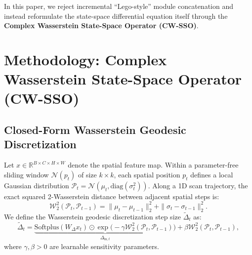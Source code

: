 \documentclass[10pt,journal,compsoc]{IEEEtran}
\begin{document}
In this paper, we reject incremental ``Lego-style'' module concatenation and instead reformulate the state-space differential equation itself through the \textbf{Complex Wasserstein State-Space Operator (CW-SSO)}.

\section{Methodology: Complex Wasserstein State-Space Operator (CW-SSO)}

\subsection{Closed-Form Wasserstein Geodesic Discretization}
Let $x \in \mathbb{R}^{B \times C \times H \times W}$ denote the spatial feature map. Within a parameter-free sliding window $\mathcal{N}(p_t)$ of size $k \times k$, each spatial position $p_t$ defines a local Gaussian distribution $\mathcal{P}_t = \mathcal{N}(\mu_t, \mathrm{diag}(\sigma_t^2))$. Along a 1D scan trajectory, the exact squared 2-Wasserstein distance between adjacent spatial steps is:
\begin{equation}
    \mathcal{W}_2^2(\mathcal{P}_t, \mathcal{P}_{t-1}) = \|\mu_t - \mu_{t-1}\|_2^2 + \|\sigma_t - \sigma_{t-1}\|_2^2.
\end{equation}
We define the Wasserstein geodesic discretization step size $\tilde{\Delta}_t$ as:
\begin{equation}
    \tilde{\Delta}_t = \underbrace{\mathrm{Softplus}(W_\Delta x_t) \odot \exp\big(-\gamma \mathcal{W}_2^2(\mathcal{P}_t, \mathcal{P}_{t-1})\big)}_{\Delta_{\mathrm{in}, t}} + \beta \mathcal{W}_2^2(\mathcal{P}_t, \mathcal{P}_{t-1}),
\end{equation}
where $\gamma, \beta > 0$ are learnable sensitivity parameters.
\end{document}
